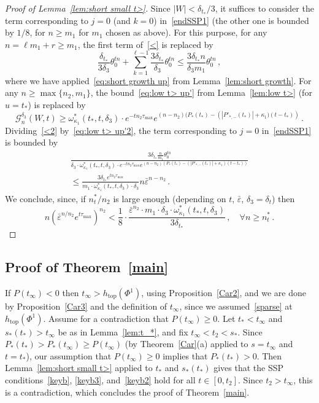 \documentclass[AHL,Unicode,longabstracts,published]{cedram}
\newcommand{\cG}{\mathcal{G}}
\newcommand{\ve}{\varepsilon}
\newcommand{\htop}{h_{\scriptstyle{\text{top}}}}
\let\oldforall\forall
\renewcommand*{\forall}{\mathrel{\oldforall}}
\newcommand{\htop}{h_{\scriptstyle{\text{top}}}}
\begin{document}
\begin{proof}[Proof of Lemma~\ref{lem:short small t>}]
Since $|W|<\delta_{t_*}/3$, it suffices to consider the term corresponding to $j=0$ (and $k=0$) in~\eqref{endSSP1} (the other one is bounded by $1/8$, for $n\ge m_1$ for $m_1$ chosen as above). For this purpose, for any $n=\ell m_1+r \ge m_1$, the first term of~\eqref{<} is replaced by
\begin{equation}\label{<2}
\frac{\delta_{t_*}}{3 \delta_3} \theta_0^{tn} + \sum_{k=1}^{\ell-1} \frac{3\delta_{t_*}}{\delta_3} \theta_0^{t n}
\le \frac{3 \delta_{t_*} n}{\delta_3 m_1} \theta_0^{t n } \,,
\end{equation}
where we have applied~\eqref{eq:short growth up} from Lemma~\ref{lem:short growth}. For any $n\ge \max\{n_2, m_1\}$, the bound~\eqref{eq:low t> up'} from Lemma~\ref{lem:low t>} (for $u=t_*$) is replaced by
\begin{equation}\label{eq:low t> up'2}
\cG_n^{\delta_3}(W,t)
\ge
\omega_{\kappa_1}^*(t_*,t, \delta_3) \cdot e^{-tn_2\tau_{\max}} e^{(n-n_2)(P_*(t_*)-\left(\left| P'_{*,-}(t_*)\right| + \kappa_1)(t-t_*)\right)} \,.
\end{equation}
Dividing~\eqref{<2} by~\eqref{eq:low t> up'2}, the term corresponding to $j=0$ in~\eqref{endSSP1} is bounded by
\begin{multline*}
\frac{3 { \delta_{t_*} } \frac{n}{m_1} \theta_0^{t n } } {\delta_3 \cdot \omega_{\kappa_1}^*(t_*,t, \delta_3) \cdot e^{-tn_2\tau_{\max}} e^{(n-n_2)\left(P_*(t_*)-\left(\left| P'_{*,-}(t_*)\right| + \kappa_1\right)(t-t_*)\right)}}\\
\le \frac{3 { \delta_{t_*} } e^{tn_2\tau_{\max}}} {m_1 \cdot \omega_{\kappa_1}^*(t_*,t, \delta_3)\cdot \delta_3 } n \bar \ve^{n-n_2}\,.
\end{multline*}
We conclude, since, if $n^*_t/n_2$ is large enough (depending on $t$, $\bar \ve$, $\delta_3=\delta_t$) then
\[
n\left(\bar \ve^{n/n_2} e^{t\tau_{\max}}\right)^{n_2}<
\frac 1 8 \cdot\frac{\bar \ve^{n_2} \cdot { m_1 \cdot } \delta_3\cdot \omega_{\kappa_1}^*(t_*,t, \delta_3) } {3 { \delta_{t_*} } }\,, \quad \forall n\ge n^*_t\,.
\]
\end{proof}

\subsection{Proof of Theorem~\ref{main}}\label{proofmain}


If $P(t_\infty)< 0$ then $t_\infty >\htop(\Phi^1)$, using Proposition~\ref{Car2}, and we are done by Proposition~\ref{Car3} and the definition of $t_\infty$, since we assumed~\eqref{sparse} at $\htop(\Phi^1)$. Assume for a contradiction that $P(t_\infty)\ge 0$. Let $t_*<t_\infty$ and $s_*(t_*)>t_\infty$ be as in Lemma~\ref{lem:t_*}, and fix $t_\infty<t_2<s_*$. Since $P_*(t_*)> P_*(t_\infty)\ge P(t_\infty)$ (by Theorem~\ref{Car}(a) applied to $s=t_\infty$ and $t=t_*$), our assumption that $P(t_\infty)\ge 0$ implies that $P_*(t_*)> 0$. Then Lemma~\ref{lem:short small t>} applied to $t_*$ and $s_*(t_*)$ gives that the SSP conditions~\eqref{keyb}, \eqref{keyb3}, and~\eqref{keyb2} hold for all $t \in [0, t_2]$. Since $t_2>t_\infty$, this is a contradiction, which concludes the proof of Theorem~\ref{main}.
\end{document}
